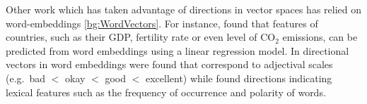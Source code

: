 Other work which has taken advantage of directions in vector spaces has relied on word-embeddings \ref{bg:WordVectors}. For instance,  \cite{gupta2015distributional} found that features of countries, such as their GDP, fertility rate or even level of CO$_2$ emissions, can be predicted from word embeddings using a linear regression model.   In \cite{kim2013deriving} directional vectors in word embeddings were found that correspond to adjectival scales (e.g.\ bad $<$ okay $<$ good $<$ excellent) while \cite{Rothe2016} found directions indicating lexical features such as the frequency of occurrence and polarity of words.
















 










